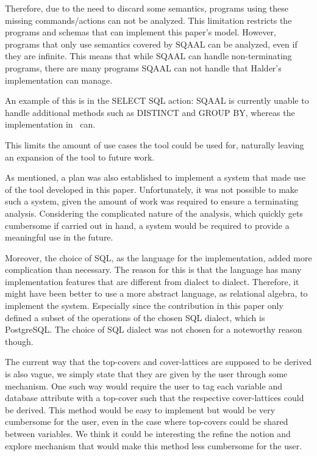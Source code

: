 Therefore, due to the need to discard some semantics, programs using these missing commands/actions can not be analyzed.
This limitation restricts the programs and schemas that can implement this paper's model.
However, programs that only use semantics covered by SQAAL can be analyzed, even if they are infinite.
This means that while SQAAL can handle non-terminating programs, there are many programs SQAAL can not handle that Halder's implementation can manage.

An example of this is in the SELECT SQL action: SQAAL is currently unable to handle additional methods such as DISTINCT and GROUP BY, whereas the implementation in~\cite{halder_abstract_2012} can.

This limits the amount of use cases the tool could be used for, naturally leaving an expansion of the tool to future work.

As mentioned, a plan was also established to implement a system that made use of the tool developed in this paper.
Unfortunately, it was not possible to make such a system, given the amount of work was required to ensure a terminating analysis.
Considering the complicated nature of the analysis, which quickly gets cumbersome if carried out in hand, a system would be required to provide a meaningful use in the future.

Moreover, the choice of SQL, as the language for the implementation, added more complication than necessary.
The reason for this is that the language has many implementation features that are different from dialect to dialect.
Therefore, it might have been better to use a more abstract language, as relational algebra, to implement the system.
Especially since the contribution in this paper only defined a subset of the operations of the chosen SQL dialect, which is PostgreSQL.
The choice of SQL dialect was not chosen for a noteworthy reason though.

The current way that the top-covers and cover-lattices are supposed to be derived is also vague, we simply state that they are given by the user through some mechanism.
One such way would require the user to tag each variable and database attribute with a top-cover such that the respective cover-lattices could be derived.
This method would be easy to implement but would be very cumbersome for the user, even in the case where top-covers could be shared between variables.
We think it could be interesting the refine the notion and explore mechanism that would make this method less cumbersome for the user.

